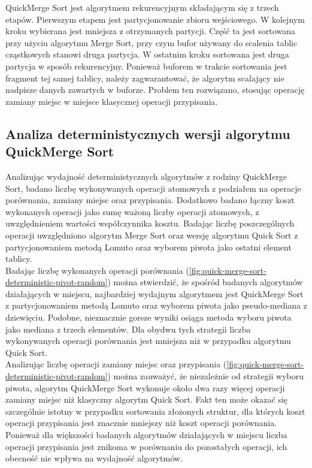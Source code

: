 QuickMerge Sort jest algorytmem rekurencyjnym składającym się z trzech etapów. Pierwszym etapem jest partycjonowanie zbioru wejściowego. W kolejnym kroku wybierana jest mniejsza z otrzymanych partycji. Część ta jest sortowana przy użyciu algorytmu Merge Sort, przy czym bufor używany do scalenia tablic cząstkowych stanowi druga partycja. W ostatnim kroku sortowana jest druga partycja w sposób rekurencyjny. Ponieważ buforem w trakcie sortowania jest fragment tej samej tablicy, należy zagwarantować, że algorytm scalający nie nadpisze danych zawartych w buforze. Problem ten rozwiązano, stosując operację zamiany miejsc w miejsce klasycznej operacji przypisania.\\



\subsection{Analiza deterministycznych wersji algorytmu QuickMerge Sort}
Analizując wydajność deterministycznych algorytmów z rodziny QuickMerge Sort, badano liczbę wykonywanych operacji atomowych z podziałem na operacje porównania, zamiany miejsc oraz przypisania. Dodatkowo badano łączny koszt wykonanych operacji jako sumę ważoną liczby operacji atomowych, z uwzględnieniem wartości współczynnika kosztu. Badając liczbę poszczególnych operacji uwzględniono algorytm Merge Sort oraz wersję algorytmu Quick Sort z partycjonowaniem metodą Lomuto oraz wyborem piwota jako ostatni element tablicy.\\ 

Badając liczbę wykonanych operacji porównania (\ref{fig:quick-merge-sort-deterministic-pivot-random}) można stwierdzić, 
że spośród badanych algorytmów działających w miejscu, najbardziej wydajnym algorytmem jest QuickMerge Sort z partycjonowaniem metodą Lomuto oraz wyborem piwota jako pseudo-mediana z dziewięciu. Podobne, nieznacznie gorsze wyniki osiąga metoda wyboru piwota jako mediana z trzech elementów. Dla obydwu tych strategii liczba wykonywanych operacji porównania jest mniejsza niż w przypadku algorytmu Quick Sort.\\

Analizując liczbę operacji zamiany miejsc oraz przypisania (\ref{fig:quick-merge-sort-deterministic-pivot-random}) można zauważyć, że niezależnie od strategii wyboru piwota, algorytm QuickMerge Sort wykonuje około dwa razy więcej operacji zamiany miejsc niż klasyczny algorytm Quick Sort. Fakt ten może okazać się szczególnie istotny w przypadku sortowania złożonych struktur, dla których koszt operacji przypisania jest znacznie mniejszy niż koszt operacji porównania. Ponieważ dla większości badanych algorytmów działających w miejscu liczba operacji przypisania jest znikoma w porównaniu do pozostałych operacji, ich obecność nie wpływa na wydajność algorytmów.\\

